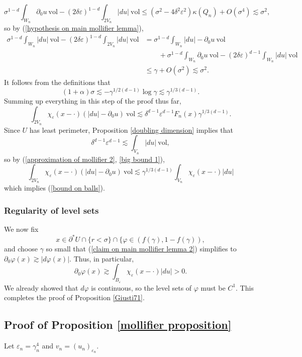 \documentclass[reqno,12pt,letterpaper]{amsart}
\newcommand{\vol}{\mathrm{vol}}
\theoremstyle{definition}
\numberwithin{equation}{section}
\begin{document}
$$\sigma^{1 - d} \int_{W_n} \partial_0 u ~\vol - (2\delta\varepsilon)^{1 - d} \int_{2V_n} |du| ~\vol \leq (\sigma^2 -4\delta^2\varepsilon^2) \kappa(Q_n) + O(\sigma^4) \lesssim \sigma^2,$$
so by (\ref{hypothesis on main mollifier lemma}),
\begin{align*}
\sigma^{1 - d} \int_{W_n} |du| ~\vol - (2\delta\varepsilon)^{1 - d} \int_{2V_n} |du| ~\vol &= \sigma^{1 - d} \int_{W_n} |du| - \partial_0u ~\vol \\
&\qquad + \sigma^{1 - d} \int_{W_n} \partial_0u ~\vol - (2\delta\varepsilon)^{d - 1} \int_{W_n} |du| ~\vol \\
&\leq \gamma + O(\sigma^2) \lesssim \sigma^2.
\end{align*}
It follows from the definitions that
$$(1 + \alpha)\sigma \lesssim -\gamma^{1/2(d - 1)} \log \gamma \lesssim \gamma^{1/3(d - 1)}.$$
Summing up everything in this step of the proof thus far,
\begin{equation}\label{big bound 1}
\int_{2V_n} \chi_\varepsilon(x - \cdot)(|du| - \partial_0u) ~\vol \lesssim \delta^{d - 1} \varepsilon^{d - 1} F_n(x) \gamma^{1/3(d - 1)}.
\end{equation}
Since $U$ has least perimeter, Proposition \ref{doubling dimension} implies that
$$\delta^{d - 1} \varepsilon^{d - 1} \lesssim \int_{V_n} |du| ~\vol,$$
so by (\ref{approximation of mollifier 2}, \ref{big bound 1}),
$$\int_{2V_n} \chi_\varepsilon(x - \cdot)(|du| - \partial_0u) ~\vol \lesssim \gamma^{1/3(d - 1)} \int_{V_n} \chi_\varepsilon(x - \cdot)|du|$$
which implies (\ref{bound on balls}).

\subsubsection{Regularity of level sets}
We now fix
$$x \in \partial^* U \cap \{r < \sigma\} \cap \{\varphi \in (f(\gamma), 1 - f(\gamma)),$$
and choose $\gamma$ so small that (\ref{claim on main mollifier lemma 2}) simplifies to $\partial_0 \varphi(x) \gtrsim |d\varphi(x)|$.
Thus, in particular,
$$\partial_0 \varphi(x) \gtrsim \int_{B_\varepsilon} \chi_\varepsilon(x - \cdot) |du| > 0.$$
We already showed that $d\varphi$ is continuous, so the level sets of $\varphi$ must be $C^1$.
This completes the proof of Proposition \ref{Giusti71}.

\subsection{Proof of Proposition \ref{mollifier proposition}}
Let $\varepsilon_n = \gamma_n^4$ and $v_n = (u_n)_{\varepsilon_n}$.
\end{document}
